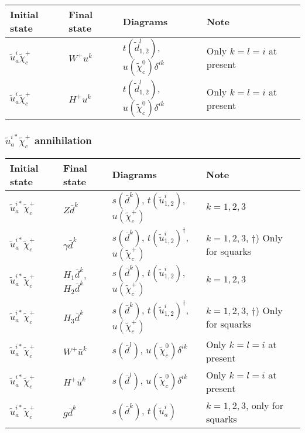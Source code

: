 \begin{center}
\begin{tabular}{llll} \hline
{\bfseries Initial state} & {\bfseries Final state} &
{\bfseries Diagrams} & {\bfseries Note} \\ \hline \tabspace
$\tilde{u}^i_a \tilde{\chi}_{c}^+$ & $W^+ u^k$ &
$t(\tilde{d}^l_{1,2})$, $u(\tilde{\chi}_c^0)\delta^{ik}$ &
Only $k=l=i$ at present \\
$\tilde{u}^i_a \tilde{\chi}_{c}^+$ & $H^+ u^k$ &
$t(\tilde{d}^l_{1,2})$, $u(\tilde{\chi}_c^0)\delta^{ik}$ 
& Only $k=l=i$ at present \\ \hline
\end{tabular}
\end{center}

\subsubsection{$\tilde{u}^{i*}_{a} \tilde{\chi}_{c}^{+}$ annihilation}

\begin{center}
\begin{tabular}{llll} \hline
{\bfseries Initial state} & {\bfseries Final state} &
{\bfseries Diagrams} & {\bfseries Note} \\ \hline \tabspace
$\tilde{u}^{i*}_a \tilde{\chi}_{c}^+$ & $Z \bar{d}^k$ &
$s(\bar{d}^k)$, $t(\tilde{u}^i_{1,2})$, $u(\tilde{\chi}_c^+)$ 
& $k=1,2,3$ \\
$\tilde{u}^{i*}_a \tilde{\chi}_{c}^+$ & $\gamma \bar{d}^k$ &
$s(\bar{d}^k)$, $t(\tilde{u}^i_{1,2})^\dagger$, $u(\tilde{\chi}_c^+)$ 
& $k=1,2,3$, $\dagger$) Only for squarks \\
$\tilde{u}^{i*}_a \tilde{\chi}_{c}^+$ & $H_1 \bar{d}^k$, $H_2 \bar{d}^k$ &
$s(\bar{d}^k)$, $t(\tilde{u}^i_{1,2})$, $u(\tilde{\chi}_c^+)$
& $k=1,2,3$ \\
$\tilde{u}^{i*}_a \tilde{\chi}_{c}^+$ & $H_3 \bar{d}^k$ &
$s(\bar{d}^k)$, $t(\tilde{u}^i_{1,2})^\dagger$, $u(\tilde{\chi}_c^+)$ 
& $k=1,2,3$, $\dagger$) Only for squarks\\
$\tilde{u}^{i*}_a \tilde{\chi}_{c}^+$ & $W^+ \bar{u}^k$ &
$s(\bar{d}^l)$, $u(\tilde{\chi}_c^0)\delta^{ik}$ 
& Only $k=l=i$ at present \\
$\tilde{u}^{i*}_a \tilde{\chi}_{c}^+$ & $H^+ \bar{u}^k$ &
$s(\bar{d}^l)$, $u(\tilde{\chi}_c^0)\delta^{ik}$ 
& Only $k=l=i$ at present \\
$\tilde{u}^{i*}_a \tilde{\chi}_{c}^+$ & $g \bar{d}^k$ &
$s(\bar{d}^k)$, $t(\tilde{u}_a^i)$ 
& $k=1,2,3$, only for squarks \\ \hline
\end{tabular}
\end{center}

